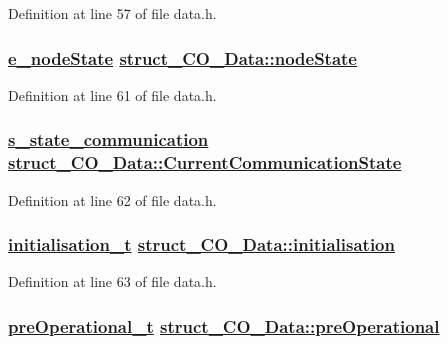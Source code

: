 Definition at line 57 of file data.h.\hypertarget{structstruct__CO__Data_a03a5121facf5b21d541f8566a8345d6}{
\subsubsection[nodeState]{\setlength{\rightskip}{0pt plus 5cm}\hyperlink{states_8h_5891f63a4c9243179838389a93d084e2}{e\_\-node\-State} \hyperlink{structstruct__CO__Data_a03a5121facf5b21d541f8566a8345d6}{struct\_\-CO\_\-Data::node\-State}}}
\label{structstruct__CO__Data_a03a5121facf5b21d541f8566a8345d6}




Definition at line 61 of file data.h.\hypertarget{structstruct__CO__Data_ab01aa22a1af1044224220cd45e5796d}{
\subsubsection[CurrentCommunicationState]{\setlength{\rightskip}{0pt plus 5cm}\hyperlink{structs__state__communication}{s\_\-state\_\-communication} \hyperlink{structstruct__CO__Data_ab01aa22a1af1044224220cd45e5796d}{struct\_\-CO\_\-Data::Current\-Communication\-State}}}
\label{structstruct__CO__Data_ab01aa22a1af1044224220cd45e5796d}




Definition at line 62 of file data.h.\hypertarget{structstruct__CO__Data_b45e9ca46cffe7924c35ae136db6a2b6}{
\subsubsection[initialisation]{\setlength{\rightskip}{0pt plus 5cm}\hyperlink{states_8h_d0cd6d1eb89085da7cb9f32ce386e8bc}{initialisation\_\-t} \hyperlink{structstruct__CO__Data_b45e9ca46cffe7924c35ae136db6a2b6}{struct\_\-CO\_\-Data::initialisation}}}
\label{structstruct__CO__Data_b45e9ca46cffe7924c35ae136db6a2b6}




Definition at line 63 of file data.h.\hypertarget{structstruct__CO__Data_d7c66fb721e3f6279a6ff03bf91d82e2}{
\subsubsection[preOperational]{\setlength{\rightskip}{0pt plus 5cm}\hyperlink{states_8h_f4a6da4fe018afbe20eaf716c248e02a}{pre\-Operational\_\-t} \hyperlink{structstruct__CO__Data_d7c66fb721e3f6279a6ff03bf91d82e2}{struct\_\-CO\_\-Data::pre\-Operational}}}
\label{structstruct__CO__Data_d7c66fb721e3f6279a6ff03bf91d82e2}




